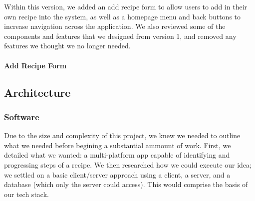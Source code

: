 \documentclass{article}
\begin{document}
Within this version, we added an add recipe form to allow users to add in their own recipe into the system, as well as a homepage menu and back buttons to increase navigation across the application. We also reviewed some of the components and features that we designed from version 1, and removed any features we thought we no longer needed.

\paragraph{Add Recipe Form}

\subsection{Architecture}
\subsubsection{Software}
Due to the size and complexity of this project, we knew we needed to outline what we needed before begining a substantial ammount of work. First, we detailed what we wanted: a multi-platform app capable of identifying and progressing steps of a recipe. We then researched how we could execute our idea; we settled on a basic client/server approach using a client, a server, and a database (which only the server could access). This would comprise the basis of our tech stack.
\end{document}
